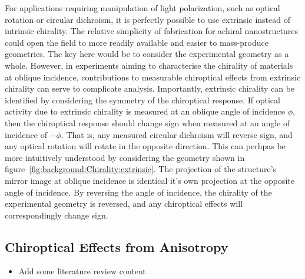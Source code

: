 For applications requiring manipulation of light polarization, such as optical rotation or circular dichroism, it is perfectly possible to use extrinsic instead of intrinsic chirality. The relative simplicity of fabrication for achiral nanostructures could open the field to more readily available and easier to mass-produce geometries. The key here would be to consider the experimental geometry as a whole. However, in experiments aiming to characterise the chirality of materials at oblique incidence, contributions to measurable chiroptical effects from extrinsic chirality can serve to complicate analysis. Importantly, extrinsic chirality can be identified by considering the symmetry of the chiroptical response. If optical activity due to extrinsic chirality is measured at an oblique angle of incidence $\phi$, then the chiroptical response should change sign when measured at an angle of incidence of $-\phi$. That is, any measured circular dichroism will reverse sign, and any optical rotation will rotate in the opposite direction. This can perhpas be more intuitively understood by considering the geometry shown in figure~\ref{fig:background:Chirality:extrinsic}. The projection of the structure's mirror image at oblique incidence is identical it's own projection at the opposite angle of incidence. By reversing the angle of incidence, the chirality of the experimental geometry is reversed, and any chiroptical effects will correspondingly change sign.



\subsection{Chiroptical Effects from Anisotropy}\label{sec:background:Chirality:anisotropy}

\begin{itemize}
    \item Add some literature review content
\end{itemize}

